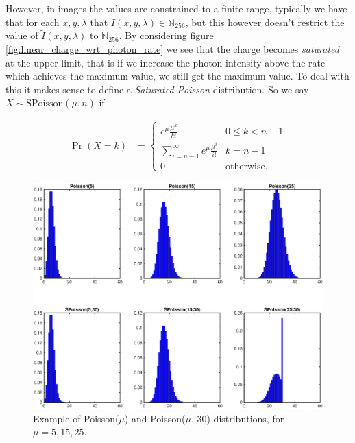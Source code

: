 \documentclass[12pt,twoside,notitlepage]{report}
\newcommand{\bb}[1]{\mathbb{#1}}
\begin{document}
            However, in images the values are constrained to a finite range, typically we have that for each $x, y, 
            \lambda$ that $I(x,y,\lambda) \in \bb{N}_{256}$, but this however doesn't restrict the value of
            $\tilde{I}(x,y,\lambda)$ to $\bb{N}_{256}$. By considering figure \ref{fig:linear_charge_wrt_photon_rate} 
            we see that the charge becomes \textit{saturated} at the upper limit, that is if we increase the photon 
            intensity above the rate which achieves the maximum value, we still get the maximum value. To deal with this 
            it makes sense to define a \textit{Saturated Poisson} distribution. So we say $X \sim \text{SPoisson}(\mu, n)$ 
            if 

            \begin{align}
                \Pr(X = k) & = 
                    \begin{cases}
                        e^{\mu} \frac{\mu^k}{k!} & 0 \leq k < n-1 \\
                        \sum\limits_{i=n-1}^\infty e^{\mu} \frac{\mu^i}{i!} & k = n-1 \\
                        0 & \text{otherwise}.
                    \end{cases} 
            \end{align}

            \begin{figure}[H]
                \centering 
                \includegraphics[scale=0.5]{poisson_distributions}
                \caption{Example of Poisson($\mu$) and Poisson($\mu$, 30) distributions, for $\mu = 5,15,25$.}
            \end{figure}
\end{document}
